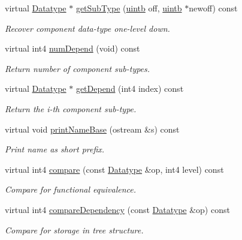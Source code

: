 \begin{DoxyCompactItemize}
virtual \mbox{\hyperlink{class_datatype}{Datatype}} $\ast$ \mbox{\hyperlink{class_type_array_a47579d472b40e0cdf7ecb95da258e870}{get\+Sub\+Type}} (\mbox{\hyperlink{types_8h_a2db313c5d32a12b01d26ac9b3bca178f}{uintb}} off, \mbox{\hyperlink{types_8h_a2db313c5d32a12b01d26ac9b3bca178f}{uintb}} $\ast$newoff) const
\begin{DoxyCompactList}\small\item\em Recover component data-\/type one-\/level down. \end{DoxyCompactList}\item 
virtual int4 \mbox{\hyperlink{class_type_array_a556eb708ac21f5a9132efbf865a34831}{num\+Depend}} (void) const
\begin{DoxyCompactList}\small\item\em Return number of component sub-\/types. \end{DoxyCompactList}\item 
virtual \mbox{\hyperlink{class_datatype}{Datatype}} $\ast$ \mbox{\hyperlink{class_type_array_ab5d2632de93ac8f4e0d36d804a2debda}{get\+Depend}} (int4 index) const
\begin{DoxyCompactList}\small\item\em Return the i-\/th component sub-\/type. \end{DoxyCompactList}\item 
virtual void \mbox{\hyperlink{class_type_array_aa3c9c83ca86e94bb58772d9933d88617}{print\+Name\+Base}} (ostream \&s) const
\begin{DoxyCompactList}\small\item\em Print name as short prefix. \end{DoxyCompactList}\item 
virtual int4 \mbox{\hyperlink{class_type_array_a25246a42499f1bc0f9a6c8c5f8224c74}{compare}} (const \mbox{\hyperlink{class_datatype}{Datatype}} \&op, int4 level) const
\begin{DoxyCompactList}\small\item\em Compare for functional equivalence. \end{DoxyCompactList}\item 
virtual int4 \mbox{\hyperlink{class_type_array_a10550a6f660c7c7a4f06ca00eae2319f}{compare\+Dependency}} (const \mbox{\hyperlink{class_datatype}{Datatype}} \&op) const
\begin{DoxyCompactList}\small\item\em Compare for storage in tree structure. \end{DoxyCompactList}\item 

\end{DoxyCompactItemize}
